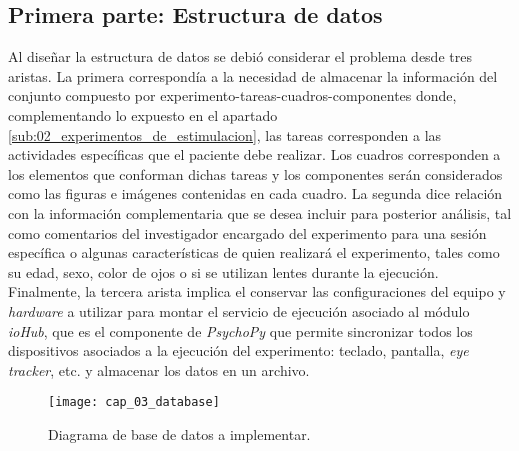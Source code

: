 \documentclass[\main/main.tex]{subfiles}
\begin{document}
		\subsection{Primera parte: Estructura de datos}
		\label{sub:03_estructura_datos}
			Al diseñar la estructura de datos se debió considerar el problema desde tres aristas. La primera correspondía a la necesidad de almacenar la información del conjunto compuesto por experimento-tareas-cuadros-componentes donde, complementando lo expuesto en el apartado \ref{sub:02_experimentos_de_estimulacion}, las tareas corresponden a las actividades específicas que el paciente debe realizar. Los cuadros corresponden a los elementos que conforman dichas tareas y los componentes serán considerados como las figuras e imágenes contenidas en cada cuadro. La segunda dice relación con la información complementaria que se desea incluir para posterior análisis, tal como comentarios del investigador encargado del experimento para una sesión específica o algunas características de quien realizará el experimento, tales como su edad, sexo, color de ojos o si se utilizan lentes durante la ejecución. Finalmente, la tercera arista implica el conservar las configuraciones del equipo y \textit{hardware} a utilizar para montar el servicio de ejecución asociado al módulo \textit{ioHub}, que es el componente de \textit{PsychoPy} que permite sincronizar todos los dispositivos asociados a la ejecución del experimento: teclado, pantalla, \textit{eye tracker}, etc. y almacenar los datos en un archivo. 
			\begin{figure}[H]
				\centering
				\texttt{[image: cap\_03\_database]}
				\caption{Diagrama de base de datos a implementar.}
				\label{fig:03_database}
			\end{figure} 
\end{document}
